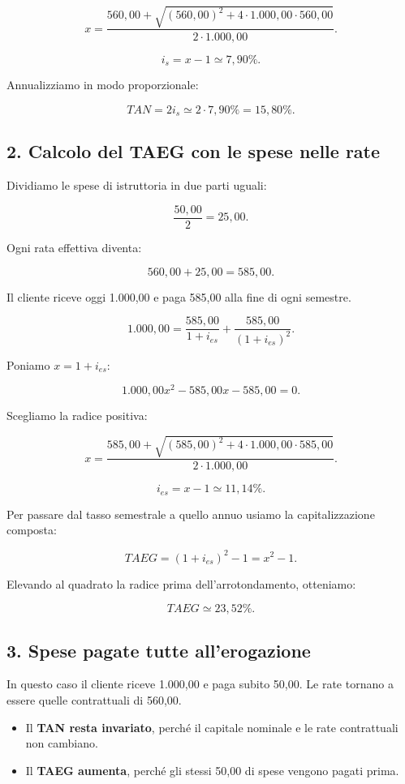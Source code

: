 \[
x=
\frac{
560{,}00+
\sqrt{(560{,}00)^2+4\cdot1.000{,}00\cdot560{,}00}
}{
2\cdot1.000{,}00
}.
\]

\[
i_s=x-1\simeq\boxed{7{,}90\%}.
\]

\noindent Annualizziamo in modo proporzionale:

\[
TAN=2i_s
\simeq
2\cdot7{,}90\%
=
\boxed{15{,}80\%}.
\]


\subsection*{2. Calcolo del TAEG con le spese nelle rate}

\noindent Dividiamo le spese di istruttoria
in due parti uguali:

\[
\frac{50{,}00}{2}=\boxed{25{,}00}.
\]

\noindent Ogni rata effettiva diventa:

\[
560{,}00+25{,}00=\boxed{585{,}00}.
\]

\noindent Il cliente riceve oggi 1.000,00
e paga 585,00 alla fine di ogni semestre.

\[
1.000{,}00
=
\frac{585{,}00}{1+i_{es}}
+
\frac{585{,}00}{(1+i_{es})^2}.
\]

\noindent Poniamo $x=1+i_{es}$:

\[
1.000{,}00x^2-585{,}00x-585{,}00=0.
\]

\noindent Scegliamo la radice positiva:

\[
x=
\frac{
585{,}00+
\sqrt{(585{,}00)^2+4\cdot1.000{,}00\cdot585{,}00}
}{
2\cdot1.000{,}00
}.
\]

\[
i_{es}=x-1\simeq\boxed{11{,}14\%}.
\]

\noindent Per passare dal tasso semestrale
a quello annuo usiamo la capitalizzazione composta:

\[
TAEG=(1+i_{es})^2-1=x^2-1.
\]

\noindent Elevando al quadrato la radice
prima dell'arrotondamento, otteniamo:

\[
\boxed{TAEG\simeq23{,}52\%}.
\]


\subsection*{3. Spese pagate tutte all'erogazione}

\noindent In questo caso il cliente
riceve 1.000,00 e paga subito 50,00.
Le rate tornano a essere quelle
contrattuali di 560,00.

\begin{itemize}
    \item Il \textbf{TAN resta invariato},
    perché il capitale nominale
    e le rate contrattuali non cambiano.

    \item Il \textbf{TAEG aumenta},
    perché gli stessi 50,00 di spese
    vengono pagati prima.
\end{itemize}

